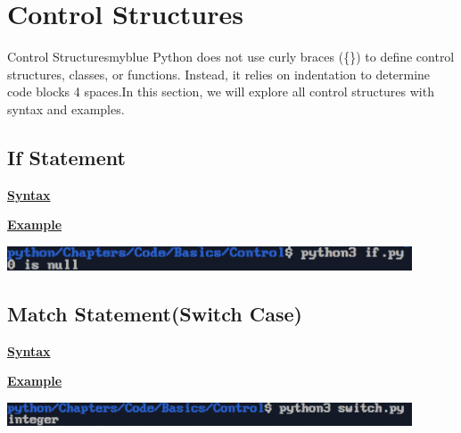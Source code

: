\newpage
\section{Control Structures}
\begin{prettyBox}{Control Structures}{myblue}
Python does not use curly braces (\{\}) to define control structures, classes, or functions.  
Instead, it relies on indentation to determine code blocks 4 spaces.In this section, we will explore all control structures with syntax and examples.
\end{prettyBox}

\vspace{1cm}
\subsection{If Statement}
\textbf{\underline{Syntax}}\\[0.1cm]



\vspace{0.8cm}

\textbf{\underline{Example}}\\[0.1cm]


\vspace{0.35cm}
\begin{center}
    \includegraphics[width = 0.9\textwidth]{Chapters/ScreenShot/Basics/Control/ifOutput.png}
\end{center}

\newpage
\subsection{Match Statement(Switch Case)}
\textbf{\underline{Syntax}}\\[0.1cm]



\vspace{0.8cm}

\textbf{\underline{Example}}\\[0.1cm]


\vspace{0.35cm}
\begin{center}
    \includegraphics[width = 0.9\textwidth]{Chapters/ScreenShot/Basics/Control/switchOutput.png}
\end{center}

